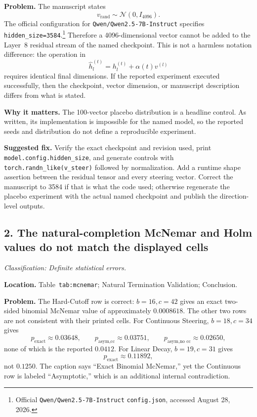 \documentclass[11pt]{article}
\newcommand{\findinglabel}[1]{\textbf{#1}}
\newcommand{\classification}[1]{\textit{Classification: #1.}}
\begin{document}
\findinglabel{Problem.} The manuscript states
\[
v_{\text{rand}}\sim\mathcal{N}(0,I_{4096}).
\]
The official configuration for \texttt{Qwen/Qwen2.5-7B-Instruct} specifies \texttt{hidden\_size=3584}.\footnote{Official \texttt{Qwen/Qwen2.5-7B-Instruct} \texttt{config.json}, accessed August 28, 2026.}  Therefore a 4096-dimensional vector cannot be added to the Layer~8 residual stream of the named checkpoint.  This is not a harmless notation difference: the operation in
\[
\hat h_l^{(t)}=h_l^{(t)}+\alpha(t)v^{(l)}
\]
requires identical final dimensions.  If the reported experiment executed successfully, then the checkpoint, vector dimension, or manuscript description differs from what is stated.

\findinglabel{Why it matters.} The 100-vector placebo distribution is a headline control.  As written, its implementation is impossible for the named model, so the reported seeds and distribution do not define a reproducible experiment.

\findinglabel{Suggested fix.} Verify the exact checkpoint and revision used, print \texttt{model.config.hidden\_size}, and generate controls with \texttt{torch.randn\_like(v\_steer)} followed by normalization.  Add a runtime shape assertion between the residual tensor and every steering vector.  Correct the manuscript to 3584 if that is what the code used; otherwise regenerate the placebo experiment with the actual named checkpoint and publish the direction-level outputs.

\subsection*{2. The natural-completion McNemar and Holm values do not match the displayed cells}

\classification{Definite statistical errors}

\findinglabel{Location.} Table~\texttt{tab:mcnemar}; Natural Termination Validation; Conclusion.

\findinglabel{Problem.} The Hard-Cutoff row is correct: $b=16,c=42$ gives an exact two-sided binomial McNemar value of approximately $0.0008618$.  The other two rows are not consistent with their printed cells.  For Continuous Steering, $b=18,c=34$ gives
\[
p_{\text{exact}}\approx0.03648,\qquad
p_{\text{asym,cc}}\approx0.03751,\qquad
p_{\text{asym,no\ cc}}\approx0.02650,
\]
none of which is the reported $0.0412$.  For Linear Decay, $b=19,c=31$ gives
\[
p_{\text{exact}}\approx0.11892,
\]
not $0.1250$.  The caption says ``Exact Binomial McNemar,'' yet the Continuous row is labeled ``Asymptotic,'' which is an additional internal contradiction.
\end{document}
